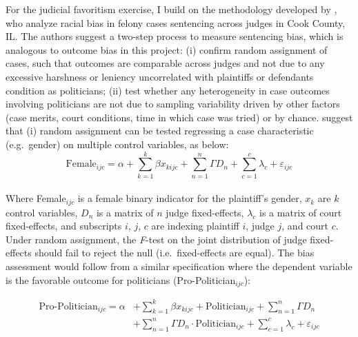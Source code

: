\documentclass[11pt]{article}
\begin{document}
For the judicial favoritism exercise, I build on the methodology developed by \citet{AbramsJudgesVaryTheir2012}, who analyze racial bias in felony cases sentencing across judges in Cook County, IL. The authors suggest a two-step process to measure sentencing bias, which is analogous to outcome bias in this project: (i) confirm random assignment of cases, such that outcomes are comparable across judges and not due to any excessive harshness or leniency uncorrelated with plaintiffs or defendants condition as politicians; (ii) test whether any heterogeneity in case outcomes involving politicians are not due to sampling variability driven by other factors (case merits, court conditions, time in which case was tried) or by chance. \citet{AbramsJudgesVaryTheir2012} suggest that (i) random assignment can be tested regressing a case characteristic (e.g.~gender) on multiple control variables, as below: \\

\begin{equation} \label{eq:methods1}
  \text{Female}_{ijc} = \alpha + \sum_{k=1}^{k} \beta x_{kijc} + \sum_{n=1}^{n} \Gamma D_{n} + \sum_{c=1}^{c} \lambda_{c} + \varepsilon_{ijc}
\end{equation} \\

Where Female$_{ijc}$ is a female binary indicator for the plaintiff's gender, $x_{k}$ are $k$ control variables, $D_{n}$ is a matrix of $n$ judge fixed-effects, $\lambda_{c}$ is a matrix of court fixed-effects, and subscripts $i$, $j$, $c$ are indexing plaintiff $i$, judge $j$, and court $c$. Under random assignment, the \emph{F}-test on the joint distribution of judge fixed-effects should fail to reject the null (i.e.~fixed-effects are equal). The bias assessment would follow from a similar specification where the dependent variable is the favorable outcome for politicians (Pro-Politician$_{ijc}$):

\begin{equation}
  \begin{split} \label{eq:methods2}
    \text{Pro-Politician}_{ijc} = \alpha & + \sum_{k=1}^{k} \beta x_{kijc} + \text{Politician}_{ijc} + \sum_{n=1}^{n} \Gamma D_{n} \\
    & + \sum_{n=1}^{n} \Gamma D_{n} \cdot \text{Politician}_{ijc} + \sum_{c=1}^{c} \lambda_{c} + \varepsilon_{ijc}
  \end{split}
\end{equation} \\
\end{document}
